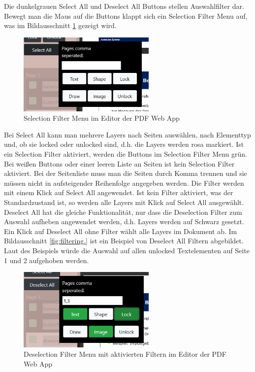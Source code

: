 Die dunkelgrauen Select All und Deselect All Buttons stellen Auswahlfilter dar. Bewegt man die Maus auf die Buttons klappt sich ein Selection Filter Menu auf, was im Bildausschnitt \ref{fig:filtermenu} gezeigt wird. 

\begin{figure}[!htbp]
	\centering
	\includegraphics[width=0.6\textwidth]{"images/filtermenu.png"}
	\caption{Selection Filter Menu im Editor der PDF Web App}
	\label{fig:filtermenu}
\end{figure}

Bei Select All kann man mehrere Layers nach Seiten auswählen, nach Elementtyp und, ob sie locked oder unlocked sind, d.h. die Layers werden rosa markiert. Ist ein Selection Filter aktiviert, werden die Buttons im Selection Filter Menu grün. Bei weißen Buttons oder einer leeren Liste an Seiten ist kein Selection Filter aktiviert. Bei der Seitenliste muss man die Seiten durch Komma trennen und sie müssen nicht in aufsteigender Reihenfolge angegeben werden. Die Filter werden mit einem Klick auf Select All angewendet. Ist kein Filter aktiviert, was der Standardzustand ist, so werden alle Layers mit Klick auf Select All ausgewählt. Deselect All hat die gleiche Funktionalität, nur dass die Deselection Filter zum Auswahl aufheben angewendet werden, d.h. Layers werden auf Schwarz gesetzt. Ein Klick auf Deselect All ohne Filter wählt alle Layers im Dokument ab. Im Bildausschnitt \ref{fig:filtering.} ist ein Beispiel von Deselect All Filtern abgebildet. Laut des Beispiels würde die Auswahl auf allen unlocked Textelementen auf Seite 1 und 2 aufgehoben werden. 

\begin{figure}[!htbp]
	\centering
	\includegraphics[width=0.6\textwidth]{"images/filtering.png"}
	\caption{Deselection Filter Menu mit aktivierten Filtern im Editor der PDF Web App}
	\label{fig:filtering}
\end{figure}

